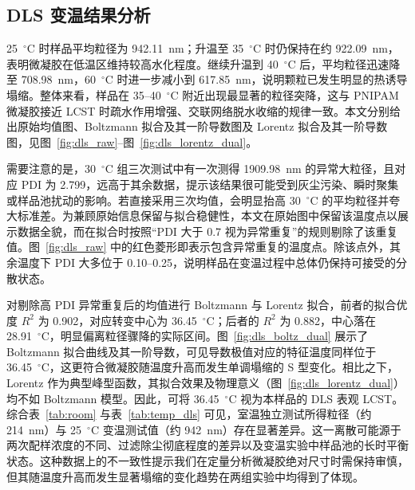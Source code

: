 \documentclass[a4paper]{article}
\begin{document}
\subsection{DLS 变温结果分析}

25~$^{\circ}$C 时样品平均粒径为 942.11~nm；升温至 35~$^{\circ}$C 时仍保持在约 922.09~nm，表明微凝胶在低温区维持较高水化程度。继续升温到 40~$^{\circ}$C 后，平均粒径迅速降至 708.98~nm，60~$^{\circ}$C 时进一步减小到 617.85~nm，说明颗粒已发生明显的热诱导塌缩。整体来看，样品在 35--40~$^{\circ}$C 附近出现最显著的粒径突降，这与 PNIPAM 微凝胶接近 LCST 时疏水作用增强、交联网络脱水收缩的规律一致。本文分别给出原始均值图、Boltzmann 拟合及其一阶导数图及 Lorentz 拟合及其一阶导数图，见图~\ref{fig:dls_raw}--图~\ref{fig:dls_lorentz_dual}。

需要注意的是，30~$^{\circ}$C 组三次测试中有一次测得 1909.98~nm 的异常大粒径，且对应 PDI 为 2.799，远高于其余数据，提示该结果很可能受到灰尘污染、瞬时聚集或样品池扰动的影响。若直接采用三次均值，会明显抬高 30~$^{\circ}$C 的平均粒径并夸大标准差。为兼顾原始信息保留与拟合稳健性，本文在原始图中保留该温度点以展示数据全貌，而在拟合时按照“PDI 大于 0.7 视为异常重复”的规则剔除了该重复值。图~\ref{fig:dls_raw} 中的红色菱形即表示包含异常重复的温度点。除该点外，其余温度下 PDI 大多位于 0.10--0.25，说明样品在变温过程中总体仍保持可接受的分散状态。

对剔除高 PDI 异常重复后的均值进行 Boltzmann 与 Lorentz 拟合，前者的拟合优度 $R^2$ 为 0.902，对应转变中心为 36.45~$^{\circ}$C；后者的 $R^2$ 为 0.882，中心落在 28.91~$^{\circ}$C，明显偏离粒径骤降的实际区间。图~\ref{fig:dls_boltz_dual} 展示了 Boltzmann 拟合曲线及其一阶导数，可见导数极值对应的特征温度同样位于 36.45~$^{\circ}$C，这更符合微凝胶随温度升高而发生单调塌缩的 S 型变化。相比之下，Lorentz 作为典型峰型函数，其拟合效果及物理意义（图~\ref{fig:dls_lorentz_dual}）均不如 Boltzmann 模型。因此，可将 36.45~$^{\circ}$C 视为本样品的 DLS 表观 LCST。综合表~\ref{tab:room} 与表~\ref{tab:temp_dls} 可见，室温独立测试所得粒径（约 214~nm）与 25~$^{\circ}$C 变温测试值（约 942~nm）存在显著差异。这一离散可能源于两次配样浓度的不同、过滤除尘彻底程度的差异以及变温实验中样品池的长时平衡状态。这种数据上的不一致性提示我们在定量分析微凝胶绝对尺寸时需保持审慎，但其随温度升高而发生显著塌缩的变化趋势在两组实验中均得到了体现。
\end{document}

